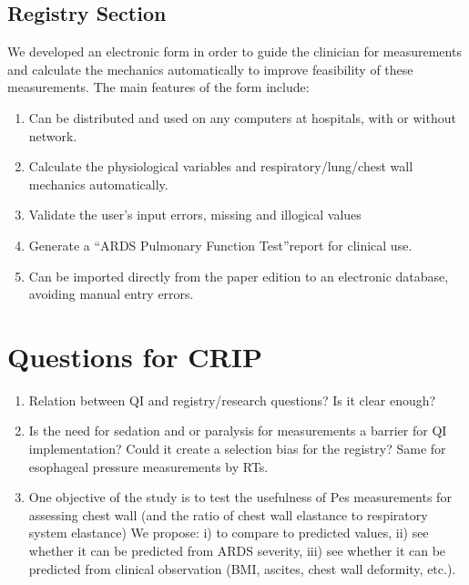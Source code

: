 \documentclass[11pt]{article} %
\begin{document}
\subsection{Registry Section}
We developed an electronic form in order to guide the clinician for measurements and calculate the mechanics automatically to improve feasibility of these measurements. The main features of the form include: 
\begin{enumerate}[label=(\alph*)]
\item Can be distributed and used on any computers at hospitals, with or without network.
\item Calculate the physiological variables and respiratory/lung/chest wall mechanics automatically.
\item Validate the user's input errors, missing and illogical values
\item Generate a \textquotedblleft ARDS Pulmonary Function Test\textquotedblright report for clinical use.
\item Can be imported directly from the paper edition to an electronic database, avoiding manual entry errors.
\end{enumerate}

\section{Questions for CRIP}
\begin{enumerate}[label=(\alph*)]
\item Relation between QI and registry/research questions? Is it clear enough?
\item Is the need for sedation and or paralysis for measurements a barrier for QI implementation? Could it create a selection bias for the registry? Same for esophageal pressure measurements by RTs.
\item One objective of the study is to test the usefulness of Pes measurements for assessing chest wall (and the ratio of chest wall elastance to respiratory system elastance) We propose: i) to compare to predicted values, ii) see whether it can be predicted from ARDS severity, iii) see whether it can be predicted from clinical observation (BMI, ascites, chest wall deformity, etc.).

\end{enumerate}

\end{document}
